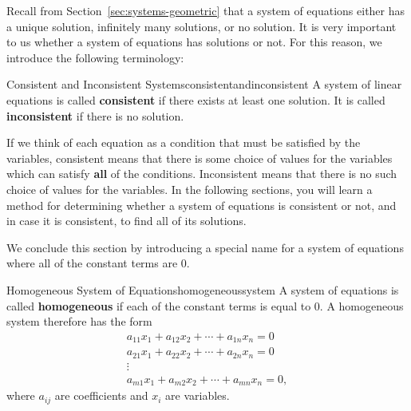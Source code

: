 Recall from Section~\ref{sec:systems-geometric} that a system of
equations either has a unique solution, infinitely many solutions, or
no solution. It is very important to us whether a system of equations
has solutions or not. For this reason, we introduce the following terminology:

\begin{definition}{Consistent and Inconsistent Systems}{consistentandinconsistent}
A system of linear equations is called
\textbf{consistent} if there exists at least one solution. It is
called
\textbf{inconsistent }if there is no solution.
\end{definition}

If we think of each equation as a condition that must be satisfied by
the variables, consistent means that there is some choice of values
for the variables which can satisfy \textbf{all} of the
conditions. Inconsistent means that there is no such choice of values
for the variables. In the following sections, you will learn a method
for determining whether a system of equations is consistent or not,
and in case it is consistent, to find all of its solutions. 


We conclude this section by introducing a special name for a system of
equations where all of the constant terms are $0$. 

\begin{definition}{Homogeneous System of Equations}{homogeneoussystem}
  A system of equations is called \textbf{homogeneous}  if each of the constant terms is equal
  to $0$. A homogeneous system therefore has the form
\begin{equation*}
\begin{array}{c}
a_{11}x_{1}+a_{12}x_{2}+\cdots +a_{1n}x_{n}= 0 \\
a_{21}x_{1}+a_{22}x_{2}+\cdots +a_{2n}x_{n}= 0  \\
\vdots \\
a_{m1}x_{1}+a_{m2}x_{2}+\cdots +a_{mn}x_{n}= 0, 
\end{array}
\end{equation*}
where $a_{ij}$ are coefficients and $x_{i}$ are variables.
\end{definition}

